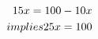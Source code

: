 \documentclass[preview]{standalone}
\begin{document}
\begin{align*}
\special{dvisvgm:raw <g id='unique000'>}15x = 100 - 10x \\implies 25x = 100\special{dvisvgm:raw </g>}
\end{align*}
\end{document}
